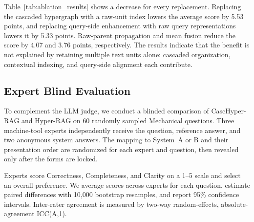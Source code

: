 \documentclass{article} %
\begin{document}
Table~\ref{tab:ablation_results} shows a decrease for every replacement. Replacing the cascaded hypergraph with a raw-unit index lowers the average score by 5.53 points, and replacing query-side enhancement with raw query representations lowers it by 5.33 points. Raw-parent propagation and mean fusion reduce the score by 4.07 and 3.76 points, respectively. The results indicate that the benefit is not explained by retaining multiple text units alone: cascaded organization, contextual indexing, and query-side alignment each contribute.
\subsection{Expert Blind Evaluation}

\begin{table}[!htbp]
\centering
\caption{Expert blind evaluation on 60 paired Mechanical questions. Scores are question-level means over three experts on a 1--5 scale. $\Delta$ is CascHyper-RAG minus Hyper-RAG; CIs are 95\% paired-bootstrap CIs.}
\label{tab:mechanical_expert_evaluation}
\setlength{\tabcolsep}{5pt}
\small
{}
\end{table}

To complement the LLM judge, we conduct a blinded comparison of CascHyper-RAG and Hyper-RAG on 60 randomly sampled Mechanical questions. Three machine-tool experts independently receive the question, reference answer, and two anonymous system answers. The mapping to System~A or B and their presentation order are randomized for each expert and question, then revealed only after the forms are locked.

Experts score Correctness, Completeness, and Clarity on a 1--5 scale and select an overall preference. We average scores across experts for each question, estimate paired differences with 10,000 bootstrap resamples, and report 95\% confidence intervals. Inter-rater agreement is measured by two-way random-effects, absolute-agreement ICC(A,1).
\end{document}
